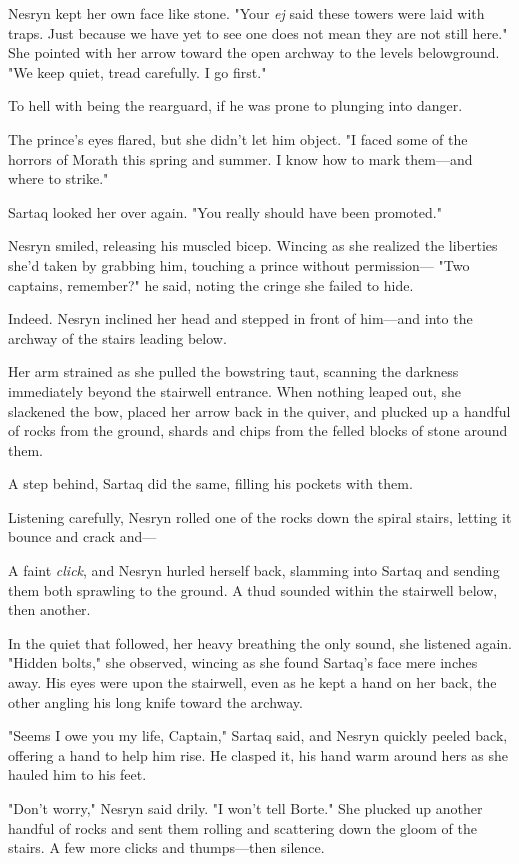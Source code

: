 Nesryn kept her own face like stone. "Your \emph{ej} said these towers were laid with traps. Just because we have yet to see one does not mean they are not still here." She pointed with her arrow toward the open archway to the levels belowground. "We keep quiet, tread carefully. I go first."

To hell with being the rearguard, if he was prone to plunging into danger.

The prince's eyes flared, but she didn't let him object. "I faced some of the horrors of Morath this spring and summer. I know how to mark them---and where to strike."

Sartaq looked her over again. "You really should have been promoted."

Nesryn smiled, releasing his muscled bicep. Wincing as she realized the liberties she'd taken by grabbing him, touching a prince without permission--- "Two captains, remember?" he said, noting the cringe she failed to hide.

Indeed. Nesryn inclined her head and stepped in front of him---and into the archway of the stairs leading below.

Her arm strained as she pulled the bowstring taut, scanning the darkness immediately beyond the stairwell entrance. When nothing leaped out, she slackened the bow, placed her arrow back in the quiver, and plucked up a handful of rocks from the ground, shards and chips from the felled blocks of stone around them.

A step behind, Sartaq did the same, filling his pockets with them.

Listening carefully, Nesryn rolled one of the rocks down the spiral stairs, letting it bounce and crack and---

A faint \emph{click}, and Nesryn hurled herself back, slamming into Sartaq and sending them both sprawling to the ground. A thud sounded within the stairwell below, then another.

In the quiet that followed, her heavy breathing the only sound, she listened again. "Hidden bolts," she observed, wincing as she found Sartaq's face mere inches away. His eyes were upon the stairwell, even as he kept a hand on her back, the other angling his long knife toward the archway.

"Seems I owe you my life, Captain," Sartaq said, and Nesryn quickly peeled back, offering a hand to help him rise. He clasped it, his hand warm around hers as she hauled him to his feet.

"Don't worry," Nesryn said drily. "I won't tell Borte." She plucked up another handful of rocks and sent them rolling and scattering down the gloom of the stairs. A few more clicks and thumps---then silence.

